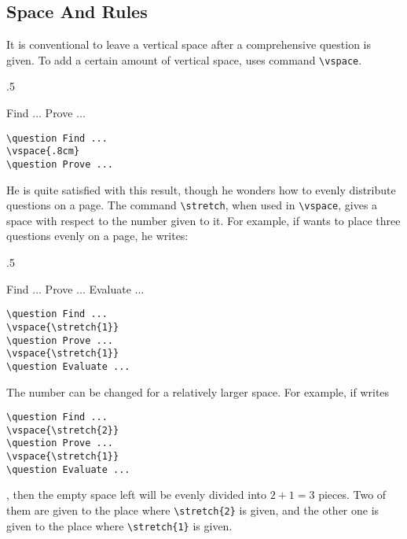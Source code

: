 \subsection{Space And Rules}
It is conventional to leave a vertical space after a comprehensive question is given. To add a certain amount of vertical space, \raul{} uses command \verb=\vspace=.
\begin{miniexammar}{.5\textandmarginlen}{
\begin{exampaper}
\question Find ...
\vspace{.8cm}
\question Prove ...
\end{exampaper}
}
\begin{lstlisting}
\question Find ...
\vspace{.8cm}
\question Prove ...
\end{lstlisting}
\end{miniexammar}

He is quite satisfied with this result, though he wonders how to evenly distribute questions on a page. The command \verb=\stretch=, when used in \verb=\vspace=, gives a space with respect to the number given to it. For example, if \raul{} wants to place three questions evenly on a page, he writes:
\begin{miniexammar}{.5\textandmarginlen}{
\begin{exampaper}
\question Find ...
\vspace{.5cm}
\question Prove ...
\vspace{.5cm}
\question Evaluate ...
\end{exampaper}
}
\begin{lstlisting}
\question Find ...
\vspace{\stretch{1}}
\question Prove ...
\vspace{\stretch{1}}
\question Evaluate ...
\end{lstlisting}
\end{miniexammar}
The number can be changed for a relatively larger space. For example, if \raul{} writes
\begin{lstlisting}
\question Find ...
\vspace{\stretch{2}}
\question Prove ...
\vspace{\stretch{1}}
\question Evaluate ...
\end{lstlisting}
, then the empty space left will be evenly divided into $2+1=3$ pieces. Two of them are given to the place where \verb=\stretch{2}= is given, and the other one is given to the place where \verb=\stretch{1}= is given.

